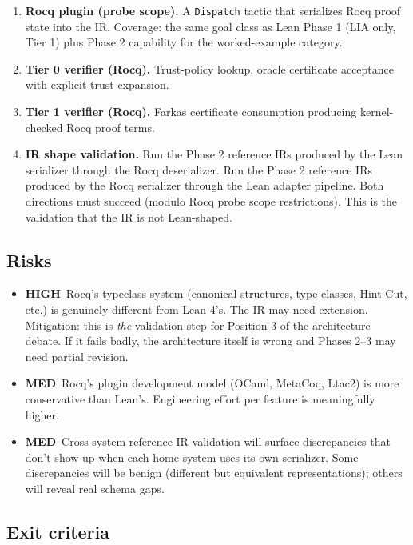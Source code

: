 \documentclass[11pt,letterpaper]{article}
\newcommand{\highrisk}{\textcolor{riskhigh}{\textbf{HIGH}}}
\newcommand{\medrisk}{\textcolor{riskmed}{\textbf{MED}}}
\begin{document}
\begin{enumerate}
  \item \textbf{Rocq plugin (probe scope).} A \texttt{Dispatch} tactic
        that serializes Rocq proof state into the IR. Coverage: the
        same goal class as Lean Phase 1 (LIA only, Tier 1) plus
        Phase 2 capability for the worked-example category.
  \item \textbf{Tier 0 verifier (Rocq).} Trust-policy lookup, oracle
        certificate acceptance with explicit trust expansion.
  \item \textbf{Tier 1 verifier (Rocq).} Farkas certificate consumption
        producing kernel-checked Rocq proof terms.
  \item \textbf{IR shape validation.} Run the Phase 2 reference IRs
        produced by the Lean serializer through the Rocq deserializer.
        Run the Phase 2 reference IRs produced by the Rocq serializer
        through the Lean adapter pipeline. Both directions must
        succeed (modulo Rocq probe scope restrictions). This is the
        validation that the IR is not Lean-shaped.
\end{enumerate}

\subsection{Risks}

\begin{itemize}
  \item \highrisk\ Rocq's typeclass system (canonical structures,
        type classes, Hint Cut, etc.) is genuinely different from
        Lean 4's. The IR may need extension. Mitigation: this is
        \emph{the} validation step for Position 3 of the architecture
        debate. If it fails badly, the architecture itself is wrong
        and Phases 2--3 may need partial revision.
  \item \medrisk\ Rocq's plugin development model (OCaml, MetaCoq,
        Ltac2) is more conservative than Lean's. Engineering effort
        per feature is meaningfully higher.
  \item \medrisk\ Cross-system reference IR validation will surface
        discrepancies that don't show up when each home system uses
        its own serializer. Some discrepancies will be benign
        (different but equivalent representations); others will reveal
        real schema gaps.
\end{itemize}

\subsection{Exit criteria}
\end{document}

